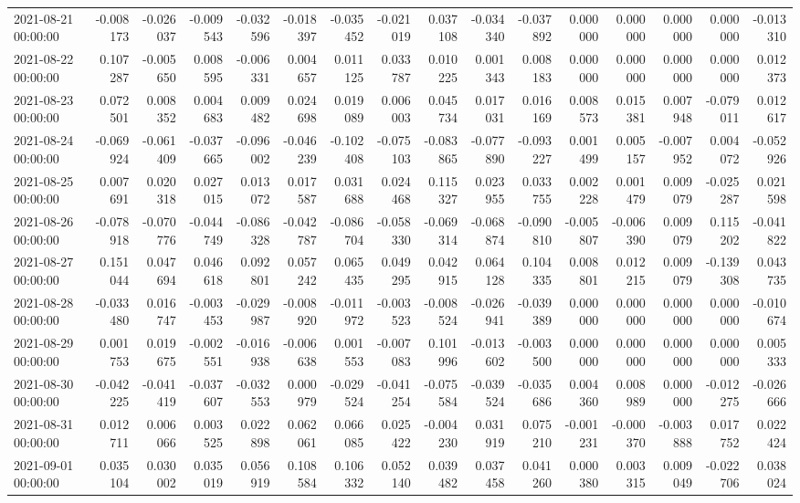 \begin{tabular}{lrrrrrrrrrrrrrrr}
2021-08-21 00:00:00 & -0.008173 & -0.026037 & -0.009543 & -0.032596 & -0.018397 & -0.035452 & -0.021019 & 0.037108 & -0.034340 & -0.037892 & 0.000000 & 0.000000 & 0.000000 & 0.000000 & -0.013310 \\
2021-08-22 00:00:00 & 0.107287 & -0.005650 & 0.008595 & -0.006331 & 0.004657 & 0.011125 & 0.033787 & 0.010225 & 0.001343 & 0.008183 & 0.000000 & 0.000000 & 0.000000 & 0.000000 & 0.012373 \\
2021-08-23 00:00:00 & 0.072501 & 0.008352 & 0.004683 & 0.009482 & 0.024698 & 0.019089 & 0.006003 & 0.045734 & 0.017031 & 0.016169 & 0.008573 & 0.015381 & 0.007948 & -0.079011 & 0.012617 \\
2021-08-24 00:00:00 & -0.069924 & -0.061409 & -0.037665 & -0.096002 & -0.046239 & -0.102408 & -0.075103 & -0.083865 & -0.077890 & -0.093227 & 0.001499 & 0.005157 & -0.007952 & 0.004072 & -0.052926 \\
2021-08-25 00:00:00 & 0.007691 & 0.020318 & 0.027015 & 0.013072 & 0.017587 & 0.031688 & 0.024468 & 0.115327 & 0.023955 & 0.033755 & 0.002228 & 0.001479 & 0.009079 & -0.025287 & 0.021598 \\
2021-08-26 00:00:00 & -0.078918 & -0.070776 & -0.044749 & -0.086328 & -0.042787 & -0.086704 & -0.058330 & -0.069314 & -0.068874 & -0.090810 & -0.005807 & -0.006390 & 0.009079 & 0.115202 & -0.041822 \\
2021-08-27 00:00:00 & 0.151044 & 0.047694 & 0.046618 & 0.092801 & 0.057242 & 0.065435 & 0.049295 & 0.042915 & 0.064128 & 0.104335 & 0.008801 & 0.012215 & 0.009079 & -0.139308 & 0.043735 \\
2021-08-28 00:00:00 & -0.033480 & 0.016747 & -0.003453 & -0.029987 & -0.008920 & -0.011972 & -0.003523 & -0.008524 & -0.026941 & -0.039389 & 0.000000 & 0.000000 & 0.000000 & 0.000000 & -0.010674 \\
2021-08-29 00:00:00 & 0.001753 & 0.019675 & -0.002551 & -0.016938 & -0.006638 & 0.001553 & -0.007083 & 0.101996 & -0.013602 & -0.003500 & 0.000000 & 0.000000 & 0.000000 & 0.000000 & 0.005333 \\
2021-08-30 00:00:00 & -0.042225 & -0.041419 & -0.037607 & -0.032553 & 0.000979 & -0.029524 & -0.041254 & -0.075584 & -0.039524 & -0.035686 & 0.004360 & 0.008989 & 0.000000 & -0.012275 & -0.026666 \\
2021-08-31 00:00:00 & 0.012711 & 0.006066 & 0.003525 & 0.022898 & 0.062061 & 0.066085 & 0.025422 & -0.004230 & 0.031919 & 0.075210 & -0.001231 & -0.000370 & -0.003888 & 0.017752 & 0.022424 \\
2021-09-01 00:00:00 & 0.035104 & 0.030002 & 0.035019 & 0.056919 & 0.108584 & 0.106332 & 0.052140 & 0.039482 & 0.037458 & 0.041260 & 0.000380 & 0.003315 & 0.009049 & -0.022706 & 0.038024 \\

\end{tabular}
